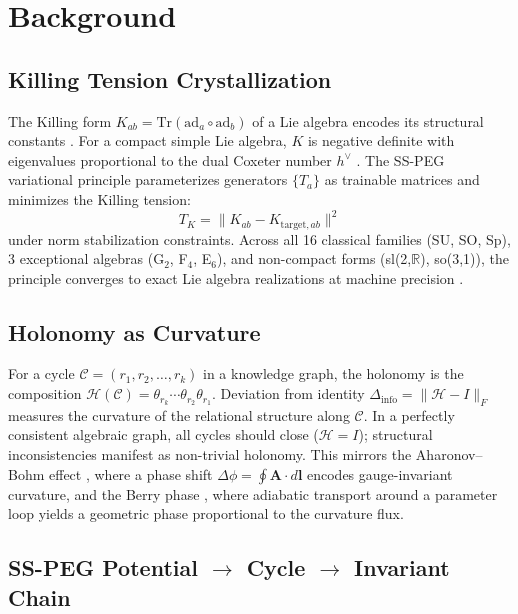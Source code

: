 \documentclass[11pt,letterpaper]{article}
\newcommand{\KH}{\mathcal{H}}
\newcommand{\KC}{\mathcal{C}}
\newcommand{\deltainfo}{\Delta_{\text{info}}}
\newcommand{\tr}{\text{Tr}}
\newcommand{\ad}{\text{ad}}
\newcommand{\hvee}{h^\vee}
\begin{document}
\section{Background}

\subsection{Killing Tension Crystallization}

The Killing form $K_{ab} = \tr(\ad_a \circ \ad_b)$ of a Lie algebra encodes its structural constants \cite{tsubouchi2021, dixmier1977, bourbaki1975}. For a compact simple Lie algebra, $K$ is negative definite with eigenvalues proportional to the dual Coxeter number $\hvee$ \cite{knapp2016, tsubouchi2022dual, brylinski1991}. The SS-PEG variational principle parameterizes generators $\{T_a\}$ as trainable matrices and minimizes the Killing tension:
\begin{equation}
T_K = \|K_{ab} - K_{\text{target},ab}\|^2
\end{equation}
under norm stabilization constraints. Across all 16 classical families (SU, SO, Sp), 3 exceptional algebras (G$_2$, F$_4$, E$_6$), and non-compact forms (sl(2,$\mathbb{R}$), so(3,1)), the principle converges to exact Lie algebra realizations at machine precision \cite{sspeg_synthesis2026, hall2003, knapp2002, varadarajan1984}.

\subsection{Holonomy as Curvature}

For a cycle $\KC = (r_1, r_2, \dots, r_k)$ in a knowledge graph, the holonomy is the composition $\KH(\KC) = \theta_{r_k} \cdots \theta_{r_2} \theta_{r_1}$. Deviation from identity $\deltainfo = \|\KH - I\|_F$ measures the curvature of the relational structure along $\KC$. In a perfectly consistent algebraic graph, all cycles should close ($\KH = I$); structural inconsistencies manifest as non-trivial holonomy. This mirrors the Aharonov--Bohm effect \cite{aharonov1959}, where a phase shift $\Delta\phi = \oint \mathbf{A} \cdot d\mathbf{l}$ encodes gauge-invariant curvature, and the Berry phase \cite{berry1984, pancharatnam1956}, where adiabatic transport around a parameter loop yields a geometric phase proportional to the curvature flux.

\subsection{SS-PEG Potential $\to$ Cycle $\to$ Invariant Chain}
\end{document}
